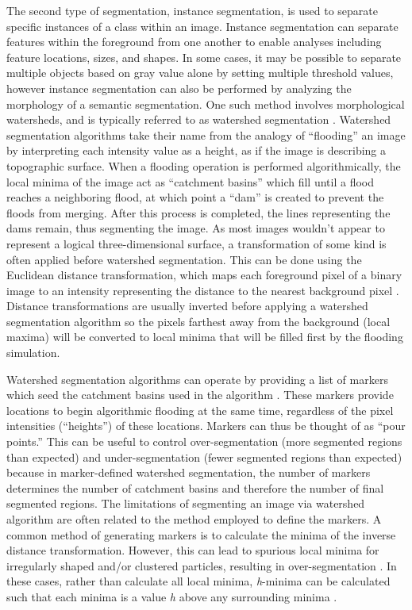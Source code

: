 The second type of segmentation, instance segmentation, is used to separate
specific instances of a class within an image.
Instance segmentation can
separate features within the foreground from one another to enable analyses
including feature locations, sizes, and shapes.
In some cases, it may be possible to separate multiple objects based
on gray value alone by setting multiple threshold values,
however instance segmentation can also be performed by analyzing the
morphology of a semantic segmentation.
One such method involves
morphological watersheds, and is typically referred to as watershed segmentation
\cite{Beucher1979,Serra1988,Soille1990sigproc,Soille1990viscomm,Beucher1992}.
Watershed
segmentation algorithms take their name from the analogy of ``flooding'' an
image by interpreting each intensity value as a height, as if the image is
describing a topographic surface. When a flooding operation is performed
algorithmically, the local minima of the image act as ``catchment basins''
which fill until a flood reaches a neighboring flood, at which point a
``dam'' is created to prevent the floods from merging. After this process is
completed, the lines representing the dams remain, thus segmenting the
image. As most images wouldn't appear to represent a logical
three-dimensional surface, a transformation of some kind is often applied
before watershed segmentation. This can be done using the Euclidean
distance transformation, which maps each foreground pixel of a binary
image to an intensity representing the distance to the nearest background
pixel \cite{Danielsson1980}. Distance transformations are usually inverted
before applying a
watershed segmentation algorithm so the pixels farthest away from the
background (local maxima) will be converted to local minima
that will be filled first by the flooding simulation.

Watershed segmentation algorithms can operate by providing a list of
markers which seed the catchment basins used in the algorithm
\cite{Moga1998,Parvati2008}. These
markers provide locations to begin algorithmic flooding at the same time,
regardless of the pixel intensities (``heights'') of these locations.
Markers can thus be
thought of as ``pour points.'' This can be useful to control
over-segmentation (more segmented regions than expected) and
under-segmentation (fewer segmented regions than expected) because in
marker-defined watershed segmentation, the number of markers determines
the number of catchment basins and therefore the number of final segmented
regions. The limitations of segmenting an image via watershed algorithm
are often related to the method employed to define the markers. A
common method of generating markers is to calculate the minima of the
inverse distance transformation. However, this can lead to spurious local
minima for irregularly shaped and/or clustered particles, resulting in
over-segmentation \cite{Sun2017}. In these cases, rather than calculate
all local minima, \textit{h}-minima can be calculated such that each minima
is a value \textit{h} above any surrounding minima \cite{Cheng2009,Jung2010}.

